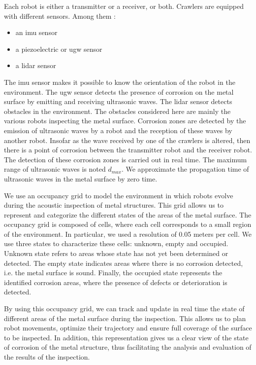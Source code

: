 Each robot is either a transmitter or a receiver, or both.
Crawlers are equipped with different sensors.
Among them :
\begin{itemize}
	\item an \gls{imu} sensor
	\item a piezoelectric or \gls{ugw} sensor
	\item a \gls{lidar} sensor
\end{itemize}
The \gls{imu} sensor makes it possible to know the orientation of the robot in the environment.
The \gls{ugw} sensor detects the presence of corrosion on the metal surface by emitting and receiving ultrasonic waves.
The \gls{lidar} sensor detects obstacles in the environment.
The obstacles considered here are mainly the various robots inspecting the metal surface.
Corrosion zones are detected by the emission of ultrasonic waves by a robot and the reception of these waves by another robot.
Insofar as the wave received by one of the crawlers is altered, then there is a point of corrosion between the transmitter robot and the receiver robot.
The detection of these corrosion zones is carried out in real time.
The maximum range of ultrasonic waves is noted $d_{max}$.
We approximate the propagation time of ultrasonic waves in the metal surface by zero time.

We use an occupancy grid to model the environment in which robots evolve during the acoustic inspection of metal structures.
This grid allows us to represent and categorize the different states of the areas of the metal surface.
The occupancy grid is composed of cells, where each cell corresponds to a small region of the environment.
In particular, we used a resolution of 0.05 meters per cell.
We use three states to characterize these cells: unknown, empty and occupied.
Unknown state refers to areas whose state has not yet been determined or detected.
The empty state indicates areas where there is no corrosion detected, i.e. the metal surface is sound.
Finally, the occupied state represents the identified corrosion areas, where the presence of defects or deterioration is detected.

By using this occupancy grid, we can track and update in real time the state of different areas of the metal surface during the inspection.
This allows us to plan robot movements, optimize their trajectory and ensure full coverage of the surface to be inspected.
In addition, this representation gives us a clear view of the state of corrosion of the metal structure, thus facilitating the analysis and evaluation of the results of the inspection.

